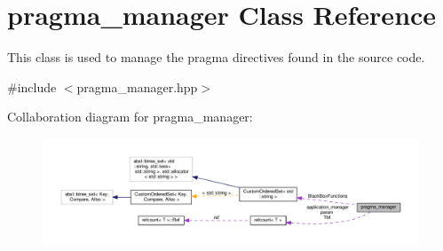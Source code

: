 \hypertarget{classpragma__manager}{}\section{pragma\+\_\+manager Class Reference}
\label{classpragma__manager}


This class is used to manage the pragma directives found in the source code.  




{\ttfamily \#include $<$pragma\+\_\+manager.\+hpp$>$}



Collaboration diagram for pragma\+\_\+manager\+:
\nopagebreak
\begin{figure}[H]
\begin{center}
\leavevmode
\includegraphics[width=350pt]{d9/d28/classpragma__manager__coll__graph}
\end{center}
\end{figure}
